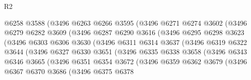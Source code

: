 \begin{lexlean}{R2}
\begin{coremodule}
                      @6258
                      @3588
                      (@3496
                        @6263
                        @6266
                        @3595
                        (@3496
                          @6271
                          @6274
                          @3602
                          (@3496
                            @6279
                            @6282
                            @3609
                            (@3496
                              @6287
                              @6290
                              @3616
                              (@3496
                                @6295
                                @6298
                                @3623
                                (@3496
                                  @6303
                                  @6306
                                  @3630
                                  (@3496
                                    @6311
                                    @6314
                                    @3637
                                    (@3496
                                      @6319
                                      @6322
                                      @3644
                                      (@3496
                                        @6327
                                        @6330
                                        @3651
                                        (@3496
                                          @6335
                                          @6338
                                          @3658
                                          (@3496
                                            @6343
                                            @6346
                                            @3665
                                            (@3496
                                              @6351
                                              @6354
                                              @3672
                                              (@3496
                                                @6359
                                                @6362
                                                @3679
                                                (@3496
                                                  @6367
                                                  @6370
                                                  @3686
                                                  (@3496
                                                    @6375
                                                    @6378

\end{coremodule}
\end{lexlean}
